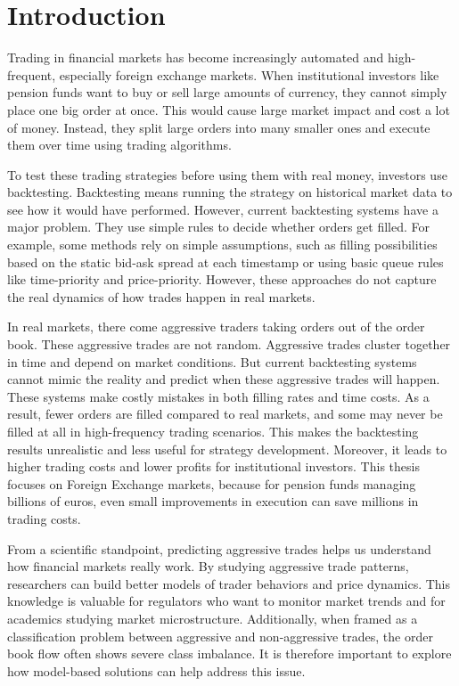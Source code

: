 \chapter{Introduction}\label{chapter:introduction}
Trading in financial markets has become increasingly automated and high-frequent, especially foreign exchange markets. When institutional investors like pension funds want to buy or sell large amounts of currency, they cannot simply place one big order at once. This would cause large market impact and cost a lot of money. Instead, they split large orders into many smaller ones and execute them over time using trading algorithms.

To test these trading strategies before using them with real money, investors use backtesting. Backtesting means running the strategy on historical market data to see how it would have performed. However, current backtesting systems have a major problem. They use simple rules to decide whether orders get filled. For example, some methods rely on simple assumptions, such as filling possibilities based on the static bid-ask spread at each timestamp or using basic queue rules like time-priority and price-priority. However, these approaches do not capture the real dynamics of how trades happen in real markets.

In real markets, there come aggressive traders taking orders out of the order book. These aggressive trades are not random. Aggressive trades cluster together in time and depend on market conditions. But current backtesting systems cannot mimic the reality and predict when these aggressive trades will happen. These systems make costly mistakes in both filling rates and time costs. As a result, fewer orders are filled compared to real markets, and some may never be filled at all in high-frequency trading scenarios. This makes the backtesting results unrealistic and less useful for strategy development. Moreover, it leads to higher trading costs and lower profits for institutional investors. This thesis focuses on Foreign Exchange markets, because for pension funds managing billions of euros, even small improvements in execution can save millions in trading costs. 

From a scientific standpoint, predicting aggressive trades helps us understand how financial markets really work. By studying aggressive trade patterns, researchers can build better models of trader behaviors and price dynamics. This knowledge is valuable for regulators who want to monitor market trends and for academics studying market microstructure. Additionally, when framed as a classification problem between aggressive and non-aggressive trades, the order book flow often shows severe class imbalance. It is therefore important to explore how model-based solutions can help address this issue.

